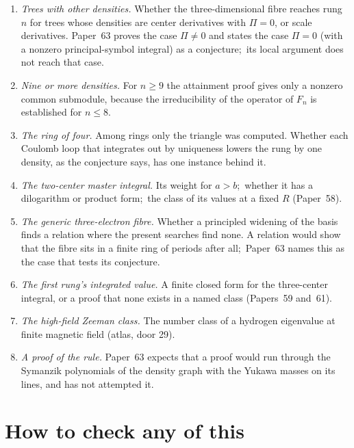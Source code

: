 \documentclass[aps,pra,twocolumn,superscriptaddress,longbibliography]{revtex4-2}
\begin{document}
\begin{enumerate}
\item \emph{Trees with other densities.}  Whether the three-dimensional
fibre reaches rung $n$ for trees whose densities are center derivatives
with $\Pi=0$, or scale derivatives.  Paper~63 proves the case $\Pi\neq0$
and states the case $\Pi=0$ (with a nonzero principal-symbol integral) as a
conjecture;\ its local argument does not reach that case.
\item \emph{Nine or more densities.}  For $n\ge9$ the attainment proof
gives only a nonzero common submodule, because the irreducibility of the
operator of $F_n$ is established for $n\le8$.
\item \emph{The ring of four.}  Among rings only the triangle was
computed.  Whether each Coulomb loop that integrates out by uniqueness
lowers the rung by one density, as the conjecture says, has one instance
behind it.
\item \emph{The two-center master integral.}  Its weight for $a>b$;\
whether it has a dilogarithm or product form;\ the class of its values
at a fixed $R$ (Paper~58).
\item \emph{The generic three-electron fibre.}  Whether a principled
widening of the basis finds a relation where the present searches find
none.  A relation would show that the fibre sits in a finite ring of
periods after all;\ Paper~63 names this as the case that tests its
conjecture.
\item \emph{The first rung's integrated value.}  A finite closed form
for the three-center integral, or a proof that none exists in a named
class (Papers~59 and~61).
\item \emph{The high-field Zeeman class.}  The number class of a
hydrogen eigenvalue at finite magnetic field (atlas, door 29).
\item \emph{A proof of the rule.}  Paper~63 expects that a proof would
run through the Symanzik polynomials of the density graph with the
Yukawa masses on its lines, and has not attempted it.
\end{enumerate}

\section{How to check any of this}
\label{sec:check}
\end{document}
